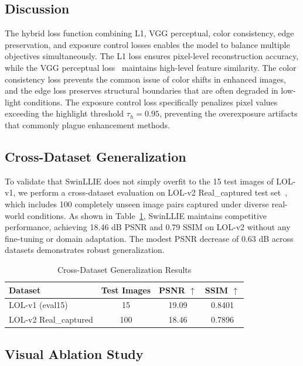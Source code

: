 \documentclass[conference]{IEEEtran}
\begin{document}
\subsection{Discussion}

The hybrid loss function combining L1, VGG perceptual, color consistency, edge preservation, and exposure control losses enables the model to balance multiple objectives simultaneously. The L1 loss ensures pixel-level reconstruction accuracy, while the VGG perceptual loss~\cite{johnson2016perceptual} maintains high-level feature similarity. The color consistency loss prevents the common issue of color shifts in enhanced images, and the edge loss preserves structural boundaries that are often degraded in low-light conditions. The exposure control loss specifically penalizes pixel values exceeding the highlight threshold $\tau_h = 0.95$, preventing the overexposure artifacts that commonly plague enhancement methods.

\subsection{Cross-Dataset Generalization}

To validate that SwinLLIE does not simply overfit to the 15 test images of LOL-v1, we perform a cross-dataset evaluation on LOL-v2 Real\_captured test set~\cite{yang2021lolv2}, which includes 100 completely unseen image pairs captured under diverse real-world conditions. As shown in Table~\ref{tab:generalization}, SwinLLIE maintains competitive performance, achieving 18.46 dB PSNR and 0.79 SSIM on LOL-v2 without any fine-tuning or domain adaptation. The modest PSNR decrease of 0.63 dB across datasets demonstrates robust generalization.

\begin{table}[htbp]
\caption{Cross-Dataset Generalization Results}
\centering
\begin{tabular}{lccc}
\toprule
\textbf{Dataset} & \textbf{Test Images} & \textbf{PSNR $\uparrow$} & \textbf{SSIM $\uparrow$} \\
\midrule
LOL-v1 (eval15) & 15 & 19.09 & 0.8401 \\
LOL-v2 Real\_captured & 100 & 18.46 & 0.7896 \\
\bottomrule
\end{tabular}
\label{tab:generalization}
\end{table}

\subsection{Visual Ablation Study}
\end{document}

